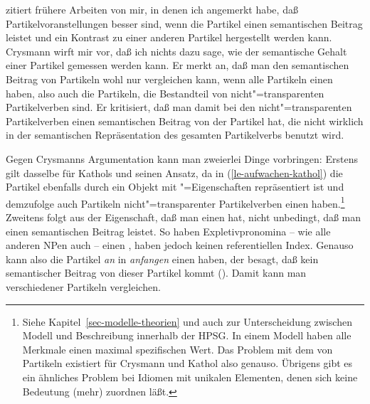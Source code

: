 \citet[Kapitel~4.2]{Crysmann2002a} zitiert frühere Arbeiten von mir, in denen ich angemerkt
habe, daß Partikelvoranstellungen besser sind, wenn die Partikel einen semantischen
Beitrag leistet und ein Kontrast zu einer anderen Partikel hergestellt werden kann.
\eal
{}
\zl
Crysmann wirft mir vor, daß ich nichts dazu sage, wie der semantische
Gehalt einer Partikel gemessen werden kann. Er merkt an, daß man den semantischen
Beitrag von Partikeln wohl nur vergleichen kann, wenn alle Partikeln einen
\contw haben, also auch die Partikeln, die Bestandteil von nicht"=transparenten
Partikelverben sind. Er kritisiert, daß man damit bei den nicht"=transparenten
Partikelverben einen semantischen Beitrag von der Partikel hat, die nicht wirklich
in der semantischen Repräsentation des gesamten Partikelverbs benutzt wird. 

Gegen Crysmanns Argumentation kann man zweierlei Dinge vorbringen: Erstens
gilt dasselbe für Kathols und seinen Ansatz, da in (\ref{le-aufwachen-kathol})
die Partikel ebenfalls durch ein Objekt mit "=Eigenschaften repräsentiert
ist und demzufolge auch Partikeln nicht"=transparenter Partikelverben einen \contw haben.\footnote{
Siehe Kapitel~\ref{sec-modelle-theorien} und auch 
zur Unterscheidung zwischen Modell und Beschreibung innerhalb der HPSG. In einem
Modell haben alle Merkmale einen maximal spezifischen Wert. Das Problem mit dem
\contw von Partikeln existiert für Crysmann und Kathol also genauso. Übrigens gibt
es ein ähnliches Problem bei Idiomen mit unikalen Elementen, denen sich keine
Bedeutung (mehr) zuordnen läßt.%
} 
Zweitens folgt aus der
Eigenschaft, daß man einen \contw hat, nicht unbedingt, daß man einen semantischen
Beitrag leistet. So haben Expletivpronomina 
-- wie alle anderen NPen auch -- einen \contw, 
haben jedoch keinen referentiellen Index. Genauso kann also die
Partikel \emph{an} in \emph{anfangen} einen \contw haben, der besagt, daß kein
semantischer Beitrag von dieser Partikel kommt (\zb {}).
Damit kann man \contwe verschiedener Partikeln vergleichen.


